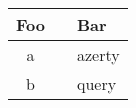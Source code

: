 \begin{longtable}{c c p{9cm}}
\hline
Foo&  \vline& Bar\\ [0.5ex]
\hline
a& \vline& azerty \\
b& \vline& query \\
\hline
\end{longtable}